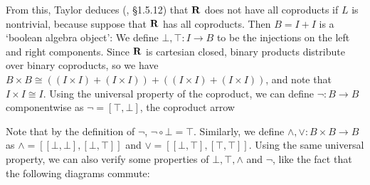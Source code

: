 From this, Taylor deduces (\autocite{taylor}, \S 1.5.12) that $ \mathbf{R} $ does not have all coproducts if $ L $ is nontrivial, because suppose that $ \mathbf{R} $ has all coproducts. Then $ B = I + I $ is a `boolean algebra object': We define $ \bot, \top: I \to B $ to be the injections on the left and right components. Since $ \mathbf{R} $ is cartesian closed, binary products distribute over binary coproducts, so we have $ B \times B \cong ((I \times I) + (I \times I)) + ((I \times I) + (I \times I)) $, and note that $ I \times I \cong I $. Using the universal property of the coproduct, we can define $ \lnot: B \to B $ componentwise as $ \lnot = [\top, \bot] $, the coproduct arrow
\begin{center}
\end{center}
Note that by the definition of $ \lnot $, $ \lnot \circ \bot = \top $. Similarly, we define $ \land, \lor : B \times B \to B $ as $ \land = [[\bot, \bot], [\bot, \top]] $ and $ \lor = [[\bot, \top], [\top, \top]] $. Using the same universal property, we can also verify some properties of $ \bot, \top, \land $ and $ \lnot $, like the fact that the following diagrams commute:
\begin{center}
\end{center}
